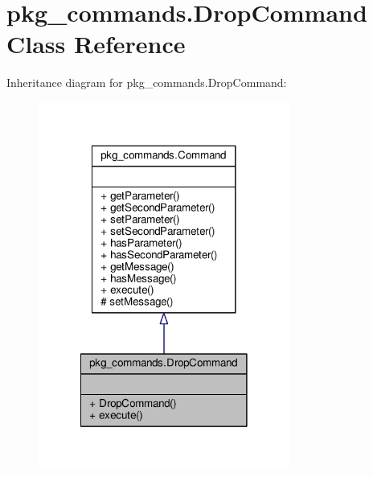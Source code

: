\hypertarget{classpkg__commands_1_1DropCommand}{\section{pkg\-\_\-commands.\-Drop\-Command Class Reference}
\label{classpkg__commands_1_1DropCommand}
}


Inheritance diagram for pkg\-\_\-commands.\-Drop\-Command\-:
\nopagebreak
\begin{figure}[H]
\begin{center}
\leavevmode
\includegraphics[width=234pt]{classpkg__commands_1_1DropCommand__inherit__graph}
\end{center}
\end{figure}


